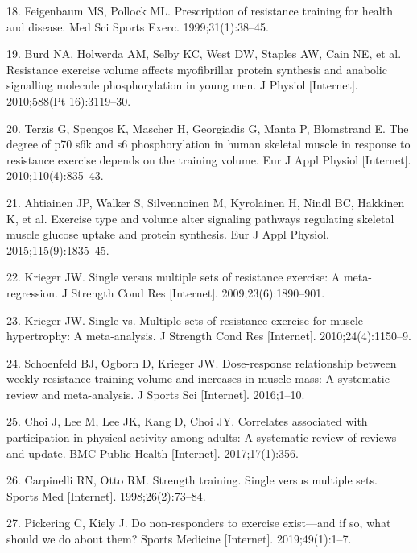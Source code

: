 \documentclass[twoside,10pt]{gihclass} %
\begin{document}
\leavevmode\hypertarget{ref-RN2538}{}%
18. Feigenbaum MS, Pollock ML. Prescription of resistance training for health and disease. Med Sci Sports Exerc. 1999;31(1):38--45.

\leavevmode\hypertarget{ref-RN791}{}%
19. Burd NA, Holwerda AM, Selby KC, West DW, Staples AW, Cain NE, et al. Resistance exercise volume affects myofibrillar protein synthesis and anabolic signalling molecule phosphorylation in young men. J Physiol {[}Internet{]}. 2010;588(Pt 16):3119--30.

\leavevmode\hypertarget{ref-RN784}{}%
20. Terzis G, Spengos K, Mascher H, Georgiadis G, Manta P, Blomstrand E. The degree of p70 s6k and s6 phosphorylation in human skeletal muscle in response to resistance exercise depends on the training volume. Eur J Appl Physiol {[}Internet{]}. 2010;110(4):835--43.

\leavevmode\hypertarget{ref-RN1837}{}%
21. Ahtiainen JP, Walker S, Silvennoinen M, Kyrolainen H, Nindl BC, Hakkinen K, et al. Exercise type and volume alter signaling pathways regulating skeletal muscle glucose uptake and protein synthesis. Eur J Appl Physiol. 2015;115(9):1835--45.

\leavevmode\hypertarget{ref-RN793}{}%
22. Krieger JW. Single versus multiple sets of resistance exercise: A meta-regression. J Strength Cond Res {[}Internet{]}. 2009;23(6):1890--901.

\leavevmode\hypertarget{ref-RN789}{}%
23. Krieger JW. Single vs. Multiple sets of resistance exercise for muscle hypertrophy: A meta-analysis. J Strength Cond Res {[}Internet{]}. 2010;24(4):1150--9.

\leavevmode\hypertarget{ref-RN1767}{}%
24. Schoenfeld BJ, Ogborn D, Krieger JW. Dose-response relationship between weekly resistance training volume and increases in muscle mass: A systematic review and meta-analysis. J Sports Sci {[}Internet{]}. 2016;1--10.

\leavevmode\hypertarget{ref-RN2063}{}%
25. Choi J, Lee M, Lee JK, Kang D, Choi JY. Correlates associated with participation in physical activity among adults: A systematic review of reviews and update. BMC Public Health {[}Internet{]}. 2017;17(1):356.

\leavevmode\hypertarget{ref-RN794}{}%
26. Carpinelli RN, Otto RM. Strength training. Single versus multiple sets. Sports Med {[}Internet{]}. 1998;26(2):73--84.

\leavevmode\hypertarget{ref-RN2547}{}%
27. Pickering C, Kiely J. Do non-responders to exercise exist---and if so, what should we do about them? Sports Medicine {[}Internet{]}. 2019;49(1):1--7.
\end{document}
